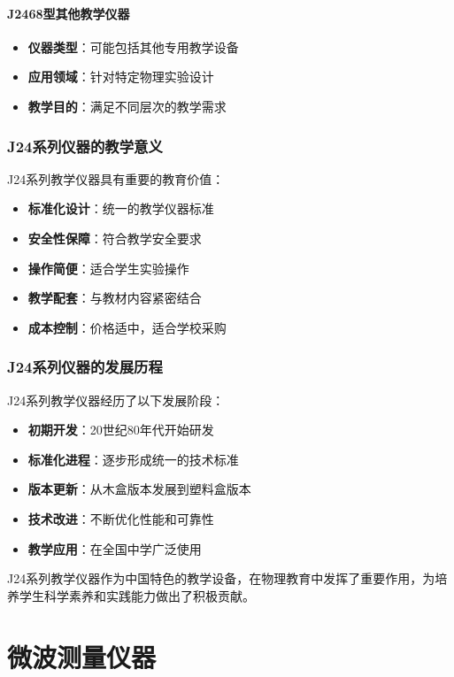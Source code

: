 \documentclass[12pt,UTF8]{ctexbook}
\begin{document}
\subsubsection{J2468型其他教学仪器}
\begin{itemize}[leftmargin=2cm]
	\item \textbf{仪器类型}：可能包括其他专用教学设备
	\item \textbf{应用领域}：针对特定物理实验设计
	\item \textbf{教学目的}：满足不同层次的教学需求
\end{itemize}

\subsection{J24系列仪器的教学意义}
J24系列教学仪器具有重要的教育价值：

\begin{itemize}[leftmargin=2cm]
	\item \textbf{标准化设计}：统一的教学仪器标准
	\item \textbf{安全性保障}：符合教学安全要求
	\item \textbf{操作简便}：适合学生实验操作
	\item \textbf{教学配套}：与教材内容紧密结合
	\item \textbf{成本控制}：价格适中，适合学校采购
\end{itemize}

\subsection{J24系列仪器的发展历程}
J24系列教学仪器经历了以下发展阶段：

\begin{itemize}[leftmargin=2cm]
	\item \textbf{初期开发}：20世纪80年代开始研发
	\item \textbf{标准化进程}：逐步形成统一的技术标准
	\item \textbf{版本更新}：从木盒版本发展到塑料盒版本
	\item \textbf{技术改进}：不断优化性能和可靠性
	\item \textbf{教学应用}：在全国中学广泛使用
\end{itemize}

J24系列教学仪器作为中国特色的教学设备，在物理教育中发挥了重要作用，为培养学生科学素养和实践能力做出了积极贡献。

\chapter{微波测量仪器}
\end{document}
